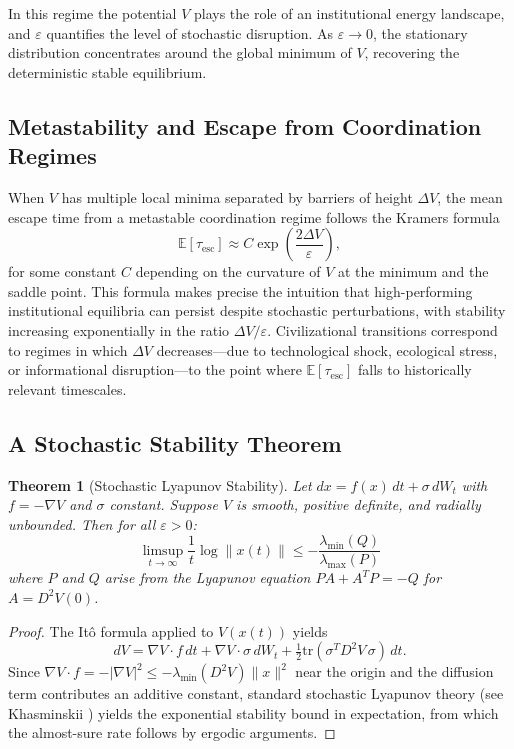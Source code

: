 \documentclass[12pt]{article}
\newtheorem{theorem}{Theorem}[section]
\begin{document}
In this regime the potential $V$ plays the role of an institutional energy landscape, and $\varepsilon$ quantifies the level of stochastic disruption. As $\varepsilon \to 0$, the stationary distribution concentrates around the global minimum of $V$, recovering the deterministic stable equilibrium.

\subsection{Metastability and Escape from Coordination Regimes}

When $V$ has multiple local minima separated by barriers of height $\Delta V$, the mean escape time from a metastable coordination regime follows the Kramers formula
\[
\mathbb{E}[\tau_{\mathrm{esc}}] \approx C \exp\!\left(\frac{2\Delta V}{\varepsilon}\right),
\]
for some constant $C$ depending on the curvature of $V$ at the minimum and the saddle point. This formula makes precise the intuition that high-performing institutional equilibria can persist despite stochastic perturbations, with stability increasing exponentially in the ratio $\Delta V / \varepsilon$. Civilizational transitions correspond to regimes in which $\Delta V$ decreases---due to technological shock, ecological stress, or informational disruption---to the point where $\mathbb{E}[\tau_{\mathrm{esc}}]$ falls to historically relevant timescales.

\subsection{A Stochastic Stability Theorem}

\begin{theorem}[Stochastic Lyapunov Stability]
Let $dx = f(x)\,dt + \sigma\,dW_t$ with $f = -\nabla V$ and $\sigma$ constant. Suppose $V$ is smooth, positive definite, and radially unbounded. Then for all $\varepsilon > 0$:
\[
\limsup_{t \to \infty} \frac{1}{t} \log \|x(t)\| \le -\frac{\lambda_{\min}(Q)}{\lambda_{\max}(P)}
\]
where $P$ and $Q$ arise from the Lyapunov equation $PA + A^T P = -Q$ for $A = D^2V(0)$.
\end{theorem}

\begin{proof}
The It\^{o} formula applied to $V(x(t))$ yields
\[
dV = \nabla V \cdot f\,dt + \nabla V \cdot \sigma\,dW_t + \tfrac{1}{2}\mathrm{tr}(\sigma^T D^2V\,\sigma)\,dt.
\]
Since $\nabla V \cdot f = -|\nabla V|^2 \le -\lambda_{\min}(D^2V)\|x\|^2$ near the origin and the diffusion term contributes an additive constant, standard stochastic Lyapunov theory (see Khasminskii \cite{khasminskii2012}) yields the exponential stability bound in expectation, from which the almost-sure rate follows by ergodic arguments.
\end{proof}
\end{document}
